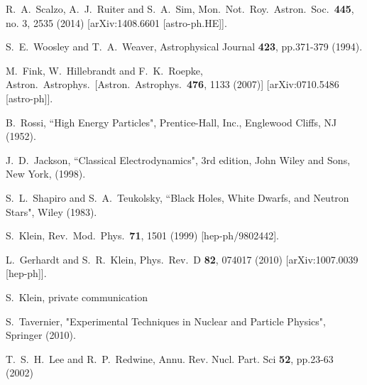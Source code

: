 \documentclass[preprintnumbers,amsmath,amssymb,prd, superscriptaddress,twocolumn]{revtex4}
\begin{document}
\begin{thebibliography}{99}
  R.~A.~Scalzo, A.~J.~Ruiter and S.~A.~Sim,
  Mon.\ Not.\ Roy.\ Astron.\ Soc.\  {\bf 445}, no. 3, 2535 (2014)
  [arXiv:1408.6601 [astro-ph.HE]].


  S.~E.~Woosley and T.~A.~Weaver, Astrophysical Journal {\bf 423}, pp.371-379 (1994).

  M.~Fink, W.~Hillebrandt and F.~K.~Roepke,
  Astron.\ Astrophys.\
  [Astron.\ Astrophys.\  {\bf 476}, 1133 (2007)]
  [arXiv:0710.5486 [astro-ph]].


B.~Rossi, ``High Energy Particles", Prentice-Hall, Inc., Englewood Cliffs, NJ (1952).

J.~D.~Jackson, ``Classical Electrodynamics", 3rd edition, John Wiley and Sons, New
York, (1998).

S.~L.~Shapiro and S.~A.~Teukolsky, ``Black Holes, White Dwarfs, and Neutron Stars", Wiley (1983).

  S.~Klein,
  Rev.\ Mod.\ Phys.\  {\bf 71}, 1501 (1999)
  [hep-ph/9802442].

  L.~Gerhardt and S.~R.~Klein,
  Phys.\ Rev.\ D {\bf 82}, 074017 (2010)
  [arXiv:1007.0039 [hep-ph]].

S.~Klein, private communication

S.~Tavernier, "Experimental Techniques in Nuclear and Particle Physics", Springer (2010).

T.~S.~H.~Lee and R.~P.~Redwine,
 Annu. Rev. Nucl. Part. Sci {\bf 52}, pp.23-63 (2002)


\end{thebibliography}
\end{document}
